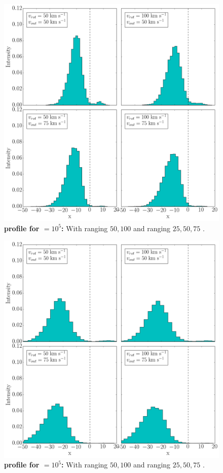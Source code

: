 \begin{figure}[h!]
	\begin{center}
		\includegraphics[width=1\textwidth]{./figures/chapter3/2_tau10E6_phi83-90}
	\end{center}
	\caption{\textbf{\lya profile for \tauh$=10^5$:} With \vrot ranging $50,100$ \kms and \vout ranging $25,50,75$ \kms.
		\label{fig:2_tau10E6_phi83-90}}
\end{figure}

\newpage

\begin{figure}[h!]
	\begin{center}
		\includegraphics[width=1\textwidth]{./figures/chapter3/2_tau10E7_phi83-90}
	\end{center}
	\caption{\textbf{\lya profile for \tauh$=10^5$:} With \vrot ranging $50,100$ \kms and \vout ranging $25,50,75$ \kms.
		\label{fig:2_tau10E7_phi83-90}}
\end{figure}